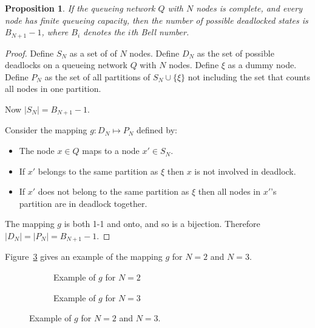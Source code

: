 \documentclass{article}
\newtheorem{proposition}{Proposition}
\begin{document}
\begin{proposition}
  If the queueing network $Q$ with $N$ nodes is complete, and every node has finite queueing capacity, then the number of possible deadlocked states is $B_{N+1} - 1$, where $B_i$ denotes the $i$th Bell number.
\end{proposition}

\begin{proof}

Define $S_N$ as a set of of $N$ nodes.
Define $D_N$ as the set of possible deadlocks on a queueing network $Q$ with $N$ nodes.
Define $\xi$ as a dummy node.
Define $P_N$ as the set of all partitions of $S_N\cup\{\xi\}$ not including the set that counts all nodes in one partition.

Now $|S_N| = B_{N+1}-1$.

Consider the mapping $g:D_N \mapsto P_N$ defined by:

\begin{itemize}
  \item The node $x \in Q$ maps to a node $x' \in S_N$.
  \item If $x'$ belongs to the same partition as $\xi$ then $x$ is not involved in deadlock.
  \item If $x'$ does not belong to the same partition as $\xi$ then all nodes in $x'$'s partition are in deadlock together.
\end{itemize}

The mapping $g$ is both 1-1 and onto, and so is a bijection.
Therefore $|D_N| = |P_N| = B_{N+1}-1$.

\end{proof}

Figure~\ref{fig:exampleofmapping} gives an example of the mapping $g$ for $N=2$ and $N=3$.

\begin{figure}[!htbp]
\begin{subfigure}[b]{\textwidth}
  \begin{center}
    
  \end{center}
  \caption{Example of $g$ for $N=2$}
  \label{fig:2Nmapping}
\end{subfigure}\newline
\newline
\begin{subfigure}[b]{\textwidth}
  
  \caption{Example of $g$ for $N=3$}
  \label{fig:3Nmapping}
\end{subfigure}
\caption{Example of $g$ for $N=2$ and $N=3$.}
\label{fig:exampleofmapping}
\end{figure}
\end{document}

